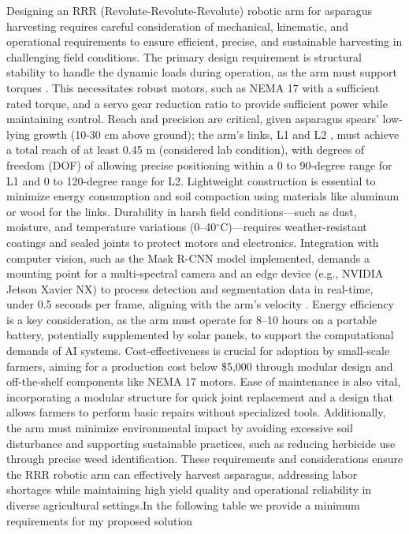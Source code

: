 Designing an RRR (Revolute-Revolute-Revolute) robotic arm for asparagus harvesting requires careful consideration of mechanical, kinematic, and operational requirements to ensure efficient, precise, and sustainable harvesting in challenging field conditions. The primary design requirement is structural stability to handle the dynamic loads during operation, as the arm must support torques . This necessitates robust motors, such as NEMA 17 with a sufficient rated torque, and a servo gear reduction ratio to provide sufficient power while maintaining control. Reach and precision are critical, given asparagus spears’ low-lying growth (10-30 cm above ground); the arm’s links, L1  and L2 , must achieve a total reach of at least 0.45 m (considered lab condition), with degrees of freedom (DOF) of allowing precise positioning within a 0 to 90-degree range for L1 and 0 to 120-degree range for L2. Lightweight construction is essential to minimize energy consumption and soil compaction using materials like aluminum or wood for the links. Durability in harsh field conditions---such as dust, moisture, and temperature variations (0--40$^\circ$C)---requires weather-resistant coatings and sealed joints to protect motors and electronics. Integration with computer vision, such as the Mask R-CNN model implemented, demands a mounting point for a multi-spectral camera and an edge device (e.g., NVIDIA Jetson Xavier NX) to process detection and segmentation data in real-time, under 0.5 seconds per frame, aligning with the arm’s velocity . Energy efficiency is a key consideration, as the arm must operate for 8--10 hours on a portable battery, potentially supplemented by solar panels, to support the computational demands of AI systems. Cost-effectiveness is crucial for adoption by small-scale farmers, aiming for a production cost below \$5,000 through modular design and off-the-shelf components like NEMA 17 motors. Ease of maintenance is also vital, incorporating a modular structure for quick joint replacement and a design that allows farmers to perform basic repairs without specialized tools. Additionally, the arm must minimize environmental impact by avoiding excessive soil disturbance and supporting sustainable practices, such as reducing herbicide use through precise weed identification. These requirements and considerations ensure the RRR robotic arm can effectively harvest asparagus, addressing labor shortages while maintaining high yield quality and operational reliability in diverse agricultural settings.In the following table we provide a minimum requirements for my proposed solution


